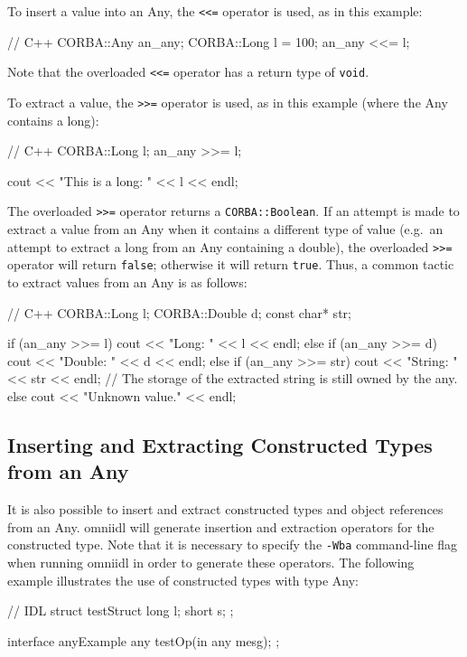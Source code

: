 \documentclass[11pt,oneside,a4paper]{book}
\newcommand{\type}[1]{\texttt{#1}}
\newcommand{\code}[1]{\texttt{#1}}
\begin{document}
To insert a value into an Any, the \code{<{}<=} operator is used, as
in this example:

\begin{cxxlisting}
// C++
CORBA::Any an_any;
CORBA::Long l = 100;
an_any <<= l;
\end{cxxlisting}

\noindent Note that the overloaded \code{<{}<=} operator has a return
type of \type{void}.

To extract a value, the \code{>{}>=} operator is used, as in this
example (where the Any contains a long):

\begin{cxxlisting}
// C++
CORBA::Long l;
an_any >>= l;

cout << "This is a long: " << l << endl;
\end{cxxlisting}


The overloaded \code{>{}>=} operator returns a \type{CORBA::Boolean}.
If an attempt is made to extract a value from an Any when it contains
a different type of value (e.g.\ an attempt to extract a long from an
Any containing a double), the overloaded \code{>{}>=} operator will
return \code{false}; otherwise it will return \code{true}. Thus, a
common tactic to extract values from an Any is as follows:

\begin{cxxlisting}
// C++
CORBA::Long l;
CORBA::Double d;
const char* str;

if (an_any >>= l) {
  cout << "Long: " << l << endl;
}
else if (an_any >>= d) {
  cout << "Double: " << d << endl;
}
else if (an_any >>= str) {
  cout << "String: " << str << endl;
  // The storage of the extracted string is still owned by the any.
}
else {
  cout << "Unknown value." << endl;
}
\end{cxxlisting}


\subsection{Inserting and Extracting Constructed Types from an Any}

It is also possible to insert and extract constructed types and object
references from an Any. omniidl will generate insertion and extraction
operators for the constructed type. Note that it is necessary to
specify the \texttt{-Wba} command-line flag when running omniidl in
order to generate these operators. The following example illustrates
the use of constructed types with type Any:

\begin{idllisting}
// IDL
struct testStruct {
  long l;
  short s;
};

interface anyExample {
  any testOp(in any mesg);
};
\end{idllisting}
\end{document}
